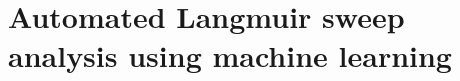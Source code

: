 \graphicspath{{../Thesis/Appendix/appendixb/}}

\chapter{Automated Langmuir sweep analysis using machine learning}
\label{apxb}

